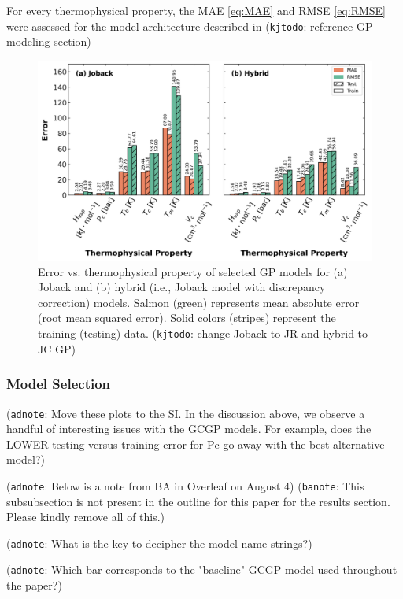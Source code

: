 \documentclass[journal=jacsat,manuscript=article]{achemso}
\newcommand{\kjtodo}[1]{{\color{Red} (\texttt{kjtodo}: #1)}}
\newcommand{\adnote}[1]{{\color{OliveGreen} (\texttt{adnote}: #1)}}
\newcommand{\banote}[1]{{\color{Salmon} (\texttt{banote}: #1)}}
\begin{document}
For every thermophysical property, the MAE \eqref{eq:MAE} and RMSE \eqref{eq:RMSE} were assessed for the model architecture described in \kjtodo{reference GP modeling section}
\begin{figure}
    \centering
    \includegraphics[width=\linewidth]{images/error_bar_chart_shared_yaxis.png}
    \caption{Error vs. thermophysical property of selected GP models for (a) Joback and (b) hybrid (i.e., Joback model with discrepancy correction) models. Salmon (green) represents mean absolute error (root mean squared error). Solid colors (stripes) represent the training (testing) data. \kjtodo{change Joback to JR and hybrid to JC GP}}
    \label{fig:enter-label}
\end{figure}
\subsubsection{Model Selection}

\adnote{Move these plots to the SI. In the discussion above, we observe a handful of interesting issues with the GCGP models. For example, does the LOWER testing versus training error for Pc go away with the best alternative model?}

\adnote{Below is a note from BA in Overleaf on August 4}
\banote{This subsubsection is not present in the outline for this paper for the results section. Please kindly remove all of this.}

\adnote{What is the key to decipher the model name strings?}

\adnote{Which bar corresponds to the "baseline" GCGP model used throughout the paper?}
\end{document}
